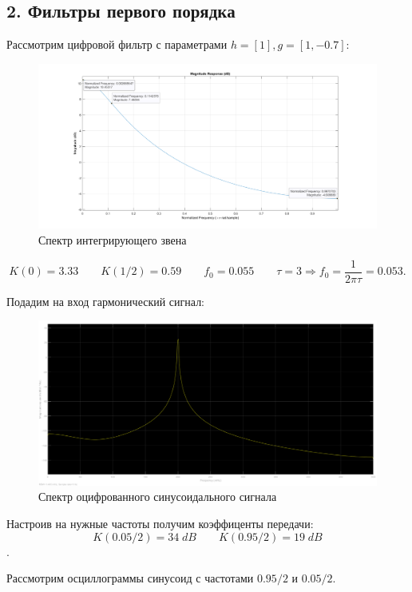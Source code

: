 \documentclass[12pt,a4paper]{article}
\begin{document}
	\subsection*{2. Фильтры первого порядка}
	
	Рассмотрим цифровой фильтр с параметрами $h = [1], g = [1, -0.7]$:
	
	\begin{figure}[H]
		\centering
		\includegraphics[width=1.0\linewidth]{res/2_2_ach.png}
		\caption{Спектр интегрирующего звена}
	\end{figure}

	$$K(0) = 3.33 \qquad K(1/2) = 0.59 \qquad f_0 = 0.055 \qquad \tau = 3 \Rightarrow f_0 = \frac{1}{2 \pi \tau} = 0.053.$$

	Подадим на вход гармонический сигнал:
	
	\begin{figure}[H]
		\centering
		\includegraphics[width=1.0\linewidth]{res/2_4_sin.png}
		\caption{Спектр оцифрованного синусоидального сигнала}
	\end{figure}

	Настроив на нужные частоты получим коэффиценты передачи:
	$$K(0.05/2) = 34 \; dB \qquad K(0.95/2) = 19 \; dB$$.

	Рассмотрим осциллограммы синусоид с частотами $0.95/2$ и $0.05/2$.
	
\end{document}
